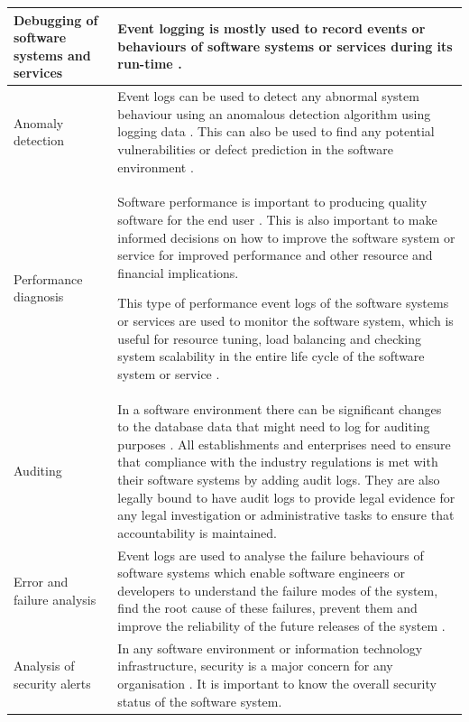 \begin{xltabular}{\textwidth}{|l|X|}
		\hline Debugging of software systems and services & Event logging is mostly used to record events or behaviours of software systems or services during its run-time \cite{Rong2018a}.\\
		\hline Anomaly detection & Event logs can be used to detect any abnormal system behaviour using an anomalous detection algorithm using logging data \cite{Gurumdimma2016}. This can also be used to find any potential vulnerabilities or defect prediction in the software environment \cite{Dwyer2013}. \\
		\hline Performance diagnosis & Software performance is important to producing quality software for the end user \cite{EvangelinGeetha2007, Baccanico2014}. This is also important to make informed decisions on how to improve the software system or service for improved performance and other resource and financial implications.\par This type of performance event logs of the software systems or services are used to monitor the software system, which is useful for resource tuning, load balancing and checking system scalability in the entire life cycle of the software system or service \cite{Song2017}. \\ 
		\hline Auditing & In a software environment there can be significant changes to the database data that might need to log for auditing purposes \cite{Rong2018a}. All establishments and enterprises need to ensure that compliance with the industry regulations is met with their software systems by adding audit logs. They are also legally bound to have audit logs to provide legal evidence for any legal investigation or administrative tasks to ensure that accountability is maintained. \\
		\hline Error and failure analysis & Event logs are used to analyse the failure behaviours of software systems which enable software engineers or developers to understand the failure modes of the system, find the root cause of these failures, prevent them and improve the reliability of the future releases of the system \cite{Cinque2013}.\\
		\hline Analysis of security alerts & In any software environment or information technology infrastructure, security is a major concern for any organisation \cite{Pathan2014, Dwyer2013}. It is important to know the overall security status of the software system. \\
\end{xltabular}

\clearpage

